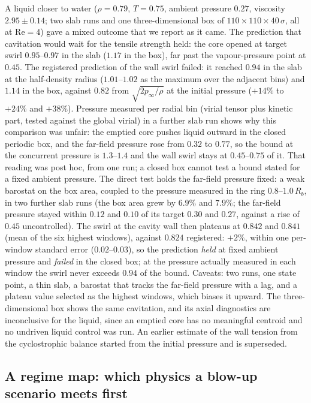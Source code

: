\documentclass[11pt,a4paper]{article}
\begin{document}
A liquid closer to water ($\rho=0.79$, $T=0.75$, ambient pressure $0.27$, viscosity $2.95\pm0.14$; two slab runs and one
three-dimensional box of $110\times110\times40\,\sigma$, all at $\mathrm{Re}=4$) gave a mixed outcome that we
report as it came. The prediction that cavitation would wait for the tensile strength held: the core opened at
target swirl $0.95$--$0.97$ in the slab ($1.17$ in the box), far past the vapour-pressure point at $0.45$. The
registered prediction of the wall swirl failed: it reached $0.94$ in the slab at the half-density radius ($1.01$--$1.02$ as the maximum over the adjacent
bins) and $1.14$ in the box, against $0.82$ from $\sqrt{2p_\infty/\rho}$ at the initial pressure ($+14\%$ to $+24\%$
and $+38\%$). Pressure measured
per radial bin (virial tensor plus kinetic part, tested against the global virial) in a further slab run shows
why this comparison was unfair: the emptied core pushes liquid outward in the closed periodic box, and the
far-field pressure rose from $0.32$ to $0.77$, so the bound at the concurrent pressure is $1.3$--$1.4$ and the wall
swirl stays at $0.45$--$0.75$ of it. That reading was post hoc, from one run; a closed box cannot test a bound stated
for a fixed ambient pressure. The direct test holds the far-field pressure fixed: a weak barostat on the box area, coupled to
the pressure measured in the ring $0.8$--$1.0\,R_b$, in two further slab runs (the box area grew by $6.9\%$ and $7.9\%$; the
far-field pressure stayed within $0.12$ and $0.10$ of its target $0.30$ and $0.27$, against a rise of $0.45$ uncontrolled). The
swirl at the cavity wall then plateaus at $0.842$ and $0.841$ (mean of the six highest windows), against $0.824$ registered:
$+2\%$, within one per-window standard error ($0.02$--$0.03$), so the prediction \emph{held} at fixed ambient pressure
and \emph{failed} in the closed box; at the pressure actually measured in each window the swirl never exceeds $0.94$ of the bound.
Caveats: two runs, one state point, a thin slab, a barostat that tracks the far-field pressure with a lag, and a plateau
value selected as the highest windows, which biases it upward. The
three-dimensional box shows the same cavitation, and its axial diagnostics are inconclusive for the liquid, since
an emptied core has no meaningful centroid and no undriven liquid control was run. An earlier estimate of the wall
tension from the cyclostrophic balance started from the initial pressure and is superseded.

\subsection{A regime map: which physics a blow-up scenario meets first}
\label{sec:regime-map}
\end{document}
